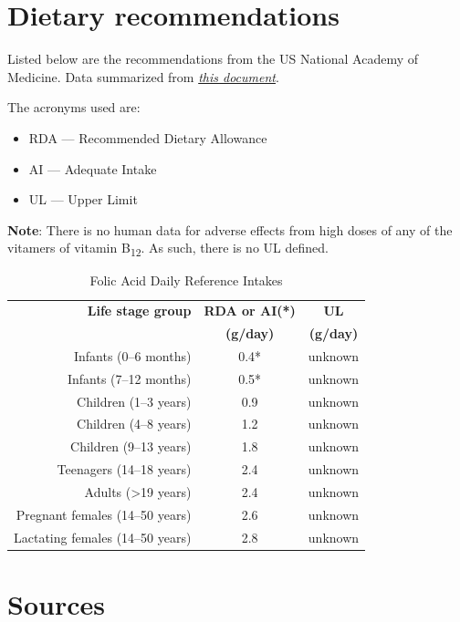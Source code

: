 \documentclass{book}
\begin{document}
\begin{sloppypar}
\section{Dietary recommendations}
Listed below are the recommendations from the US National Academy of Medicine. Data summarized from \href{https://nap.nationalacademies.org/read/6015/chapter/11}{\textit{this document}}.

The acronyms used are:
\begin{itemize}
	\item RDA --- Recommended Dietary Allowance
	\item AI --- Adequate Intake
	\item UL --- Upper Limit
\end{itemize}

\textbf{Note}: There is no human data for adverse effects from high doses of any of the vitamers of vitamin B\textsubscript{12}. As such, there is no UL defined.

\begin{table}[ht]
	\caption{Folic Acid Daily Reference Intakes}
	\centering \begin{tabular}{| r | c | c |}
		\hline
		\textbf{Life stage group} & \textbf{RDA or AI(*)} & \textbf{UL}\\
		& \textbf{(\textmu g/day)} & \textbf{(\textmu g/day)}\\ \hline
		Infants (0--6 months) & 0.4* & unknown\\ \hline
		Infants (7--12 months) & 0.5* & unknown\\ \hline
		Children (1--3 years) & 0.9 & unknown\\ \hline
		Children (4--8 years) & 1.2 & unknown\\ \hline
		Children (9--13 years) & 1.8 & unknown\\ \hline
		Teenagers (14--18 years) & 2.4 & unknown\\ \hline
		Adults (\textgreater19 years) & 2.4 & unknown\\ \hline
		Pregnant females (14--50 years) & 2.6 & unknown\\ \hline
		Lactating females (14--50 years) & 2.8 & unknown\\ \hline
	\end{tabular}
\end{table}
\newpage

\section{Sources}



\end{sloppypar}
\end{document}

